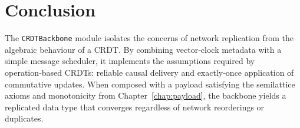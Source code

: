 \section{Conclusion}

The \texttt{CRDTBackbone} module isolates the concerns of network replication from the algebraic behaviour of a CRDT.  By combining vector‑clock metadata with a simple message scheduler, it implements the assumptions required by operation‑based CRDTs: reliable causal delivery and exactly‑once application of commutative updates\cite{shapiro2011conflict}.  When composed with a payload satisfying the semilattice axioms and monotonicity from Chapter~\ref{chap:payload}, the backbone yields a replicated data type that converges regardless of network reorderings or duplicates.

\endinput